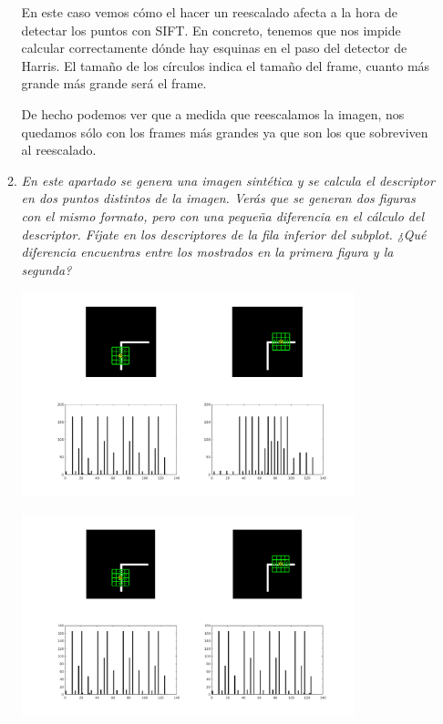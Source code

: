 \documentclass{article}
\begin{document}
\begin{enumerate}
\begin{enumerate}
En este caso vemos cómo el hacer un reescalado afecta a la hora de detectar los puntos con SIFT. En concreto, tenemos que nos impide calcular correctamente dónde hay esquinas en el paso del detector de Harris. El tamaño de los círculos indica el tamaño del frame, cuanto más grande más grande será el frame.

De hecho podemos ver que a medida que reescalamos la imagen, nos quedamos sólo con los frames más grandes ya que son los que sobreviven al reescalado.

 \item \textit{En este apartado se genera una imagen sintética y se calcula el descriptor 
en dos puntos distintos de la imagen.  Verás  que  se generan dos  figuras 
con el mismo  formato, pero con una pequeña diferencia en el cálculo del 
descriptor.  Fíjate  en los  descriptores  de la  fila inferior  del subplot.  ¿Qué 
diferencia  encuentras  entre  los  mostrados  en  la  primera  figura  y  la 
segunda?}

\begin{center}
	\includegraphics[width=0.8\textwidth]{ej34d1.png}
\end{center}

\begin{center}
	\includegraphics[width=0.8\textwidth]{ej34d2.png}
\end{center}


\end{enumerate}
\end{enumerate}
\end{document}
